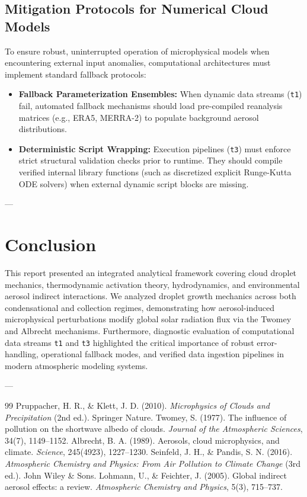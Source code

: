 \documentclass[12pt]{article}
\begin{document}
\subsection{Mitigation Protocols for Numerical Cloud Models}
To ensure robust, uninterrupted operation of microphysical models when encountering external input anomalies, computational architectures must implement standard fallback protocols:

\begin{itemize}
    \item \textbf{Fallback Parameterization Ensembles:} When dynamic data streams (\texttt{t1}) fail, automated fallback mechanisms should load pre-compiled reanalysis matrices (e.g., ERA5, MERRA-2) to populate background aerosol distributions.
    \item \textbf{Deterministic Script Wrapping:} Execution pipelines (\texttt{t3}) must enforce strict structural validation checks prior to runtime. They should compile verified internal library functions (such as discretized explicit Runge-Kutta ODE solvers) when external dynamic script blocks are missing.
\end{itemize}

---

\section{Conclusion}
This report presented an integrated analytical framework covering cloud droplet mechanics, thermodynamic activation theory, hydrodynamics, and environmental aerosol indirect interactions. We analyzed droplet growth mechanics across both condensational and collection regimes, demonstrating how aerosol-induced microphysical perturbations modify global solar radiation flux via the Twomey and Albrecht mechanisms. Furthermore, diagnostic evaluation of computational data streams \texttt{t1} and \texttt{t3} highlighted the critical importance of robust error-handling, operational fallback modes, and verified data ingestion pipelines in modern atmospheric modeling systems.

---

\begin{thebibliography}{99}
Pruppacher, H. R., \& Klett, J. D. (2010). \textit{Microphysics of Clouds and Precipitation} (2nd ed.). Springer Nature.
Twomey, S. (1977). The influence of pollution on the shortwave albedo of clouds. \textit{Journal of the Atmospheric Sciences}, 34(7), 1149--1152.
Albrecht, B. A. (1989). Aerosols, cloud microphysics, and climate. \textit{Science}, 245(4923), 1227--1230.
Seinfeld, J. H., \& Pandis, S. N. (2016). \textit{Atmospheric Chemistry and Physics: From Air Pollution to Climate Change} (3rd ed.). John Wiley \& Sons.
Lohmann, U., \& Feichter, J. (2005). Global indirect aerosol effects: a review. \textit{Atmospheric Chemistry and Physics}, 5(3), 715--737.
\end{thebibliography}
\end{document}
